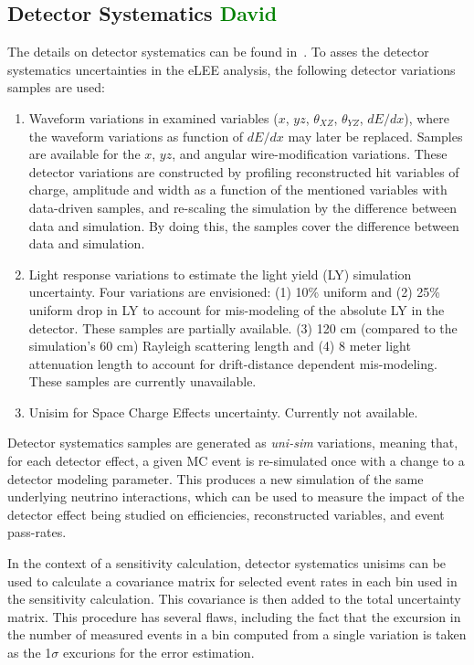 \documentclass[a4paper]{article}
\begin{document}
\subsection{Detector Systematics \textcolor{green}{David}}
The details on detector systematics can be found in~\cite{bib:detsyssupportnote}. To asses the detector systematics uncertainties in the eLEE analysis, the following detector variations samples are used:
\begin{enumerate}
    \item Waveform variations in examined variables ($x$, $yz$, $\theta_{XZ}$, $\theta_{YZ}$, $dE/dx$), where the waveform variations as function of $dE/dx$ may later be replaced. Samples are available for the $x$, $yz$, and angular wire-modification variations. These detector variations are constructed by profiling reconstructed hit variables of charge, amplitude and width as a function of the mentioned variables with data-driven samples, and re-scaling the simulation by the difference between data and simulation. By doing this, the samples cover the difference between data and simulation. 
    \item Light response variations to estimate the light yield (LY) simulation uncertainty. Four variations are envisioned: (1) 10\% uniform and (2) 25\% uniform drop in LY to account for mis-modeling of the absolute LY in the detector. These samples are partially available. (3) 120 cm (compared to the simulation's 60 cm) Rayleigh scattering length and (4) 8 meter light attenuation length to account for drift-distance dependent mis-modeling. These samples are currently unavailable.
    \item Unisim for Space Charge Effects uncertainty. Currently not available.
\end{enumerate}
\par Detector systematics samples are generated as \emph{uni-sim} variations, meaning that, for each detector effect, a given MC event is re-simulated once with a change to a detector modeling parameter. This produces a new simulation of the same underlying neutrino interactions, which can be used to measure the impact of the detector effect being studied on efficiencies, reconstructed variables, and event pass-rates.
\par In the context of a sensitivity calculation, detector systematics unisims can be used to calculate a covariance matrix for selected event rates in each bin used in the sensitivity calculation. This covariance is then added to the total uncertainty matrix. This procedure has several flaws, including the fact that the excursion in the number of measured events in a bin computed from a single variation is taken as the 1$\sigma$ excurions for the error estimation. 
\end{document}
